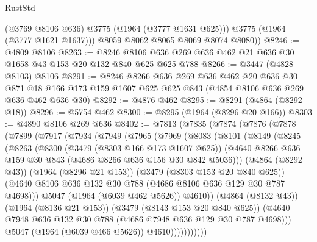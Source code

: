 \begin{lexlean}{RustStd}
\begin{coremodule}
            (@3769 @8106 @636)
            @3775
            (@1964 (@3777 @1631 @625)))
          @3775
          (@1964 (@3777 @1621 @1637)))
        @8059
        @8062
        @8065
        @8069
        @8074
        @8080))
@8246 := @4809 @8106
@8263 := @8246 @8106 @636 @269 @636 @462 @21 @636 @30 @1658 @43 @153 @20 @132 @840 @625 @625 @788
@8266 := @3447 (@4828 @8103) @8106
@8291 := @8246
    @8266
    @636
    @269
    @636
    @462
    @20
    @636
    @30
    @871
    @18
    @166
    @173
    @159
    @1607
    @625
    @625
    @843
    (@4854 @8106 @636 @269 @636 @462 @636 @30)
@8292 := @4876 @462
@8295 := @8291 (@4864 (@8292 @18))
@8296 := @5754 @462
@8300 := @8295 (@1964 (@8296 @20 @166))
@8303 := @4890 @8106 @269 @636
@8402 := @7813
    (@7835
      (@7874
        (@7876
          (@7878
            (@7899
              (@7917
                (@7934
                  (@7949
                    (@7965
                      (@7969
                        (@8083
                          (@8101
                            (@8149
                              (@8245
                                (@8263
                                  (@8300
                                    (@3479 (@8303 @166 @173 @1607 @625))
                                    (@4640
                                      @8266
                                      @636
                                      @159
                                      @30
                                      @843
                                      (@4686 @8266 @636 @156 @30 @842 @5036)))
                                  (@4864 (@8292 @43))
                                  (@1964 (@8296 @21 @153))
                                  (@3479 (@8303 @153 @20 @840 @625))
                                  (@4640
                                    @8106
                                    @636
                                    @132
                                    @30
                                    @788
                                    (@4686 @8106 @636 @129 @30 @787 @4698)))
                                @5047
                                (@1964 (@6039 @462 @5626))
                                @4610))
                            (@4864 (@8132 @43))
                            (@1964 (@8136 @21 @153))
                            (@3479 (@8143 @153 @20 @840 @625))
                            (@4640 @7948 @636 @132 @30 @788 (@4686 @7948 @636 @129 @30 @787 @4698)))
                          @5047
                          (@1964 (@6039 @466 @5626))
                          @4610)))))))))))

\end{coremodule}
\end{lexlean}
